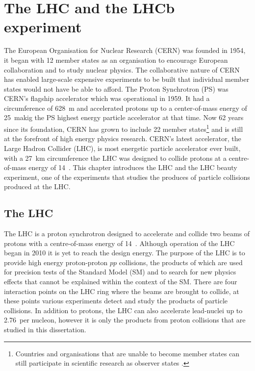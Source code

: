 \chapter{The LHC and the LHCb experiment} 
\label{CERN_LHC_LHCb}

The European Organisation for Nuclear Research (CERN) was founded in 1954, it began with 12 member states as an organisation to encourage European collaboration and to study nuclear physics. The collaborative nature of CERN has enabled large-scale expensive experiments to be built that individual member states would not have be able to afford. The Proton Synchrotron (PS) was CERN's flagship accelerator which was operational in 1959. It had a circumference of 628~m and accelerated protons up to a center-of-mass energy of 25~\gev makig the PS highest energy particle accelerator at that time. Now 62 years since its foundation, CERN has grown to include 22 member states\footnote{Countries and organisations that are unable to become member states can still participate in scientific research as observer states \cite{Member_States}.} and is still at the forefront of high energy physics research. CERN’s latest accelerator, the Large Hadron Collider (LHC), is most energetic particle accelerator ever built, with a 27~km circumference the LHC was designed to collide protons at a centre-of-mass energy of 14~\tev. This chapter introduces the LHC and the LHC beauty experiment, one of the experiments that studies the produces of particle collisions produced at the LHC.

\section{The LHC}
\label{LHC}


The LHC is a proton synchrotron designed to accelerate and collide two beams of protons with a centre-of-mass energy of 14~\tev. Although operation of the LHC began in 2010 it is yet to reach the design energy. The purpose of the LHC is to provide high energy proton-proton $pp$ collisions, the products of which are used for precision tests of the Standard Model (SM) and to search for new physics effects that cannot be explained within the context of the SM. %
There are four interaction points on the LHC ring where the beams are brought to collide, at these points various experiments detect and study the products of particle collisions. In addition to protons, the LHC can also accelerate lead-nuclei up to 2.76~\tev per nucleon, however it is only the products from proton collisions that are studied in this dissertation.

